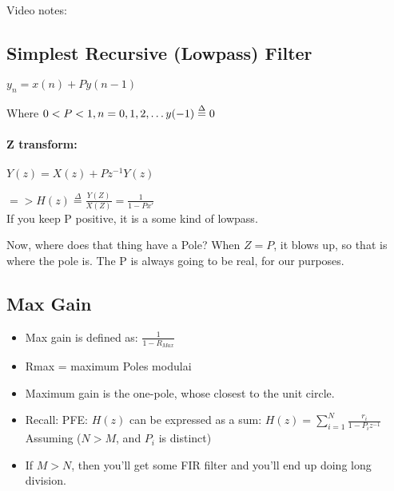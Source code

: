
Video notes: 
\subsection*{Simplest Recursive (Lowpass) Filter}

$y_n = x(n) + Py(n-1)$

Where $0 < P < 1, \\ 
n = 0, 1, 2, \dots
y(-1) \stackrel{\Delta}{=} 0
$\\\\
\textbf{Z transform:}\\\\
$Y(z) = X(z) + Pz^{-1}Y(z)$

$=> H(z) \stackrel{\Delta}{=} \frac{Y(Z)}{X(Z)}
= \frac{1}{1 - Px'}
$
\\

If you keep P positive, it is a some kind of lowpass.


Now, where does that thing have a Pole? When $Z = P$, it blows up, so that
is where the pole is. The P is always going to be real, for our purposes.



\subsection*{Max Gain}
\begin{itemize}
\item{
Max gain is defined as:
$\frac{1}{1 - R_{Max}}$
}
\item{Rmax = maximum Poles modulai}
\item{Maximum gain is the one-pole, whose closest to the unit circle.}
\item{
Recall: PFE: $H(z)$ can be expressed as a sum:
$H(z) = \sum\limits_{i = 1}^{N} \frac{r_i}{1 - P_i z^{-1}}$
Assuming ($N>M$, and $P_i$ is distinct)
}
\item{
If $M > N$, then you'll get some FIR filter and you'll end up doing long 
division.
}
\end{itemize}


